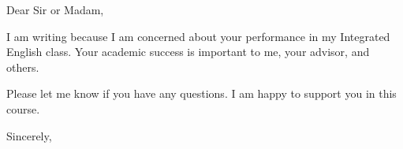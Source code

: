 \documentclass[11pt, a4paper]{letter} %
\begin{document}

\begin{letter}{
}


\opening{Dear Sir or Madam,}

I am writing because I am concerned about your performance in my Integrated English class. Your academic success is important to me, your advisor, and others.

Please let me know if you have any questions. I am happy to support you in this course.

\closing{Sincerely,}




\end{letter}
\end{document}
